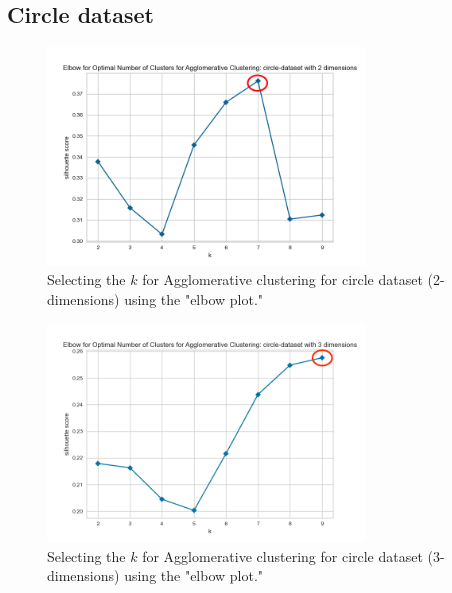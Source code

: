 \subsection{Circle dataset}

\begin{figure}[H]
  \includegraphics[width=0.75\textwidth]{Method/images/k-values/circle-dataset-2-agglomerative.png}
  \caption{Selecting the $k$ for Agglomerative clustering for circle dataset (2-dimensions) using the "elbow plot."}
  \label{hyperparameters:agglomerative-circle-dataset-2d}
\end{figure}
\begin{figure}[H]
  \includegraphics[width=0.75\textwidth]{Method/images/k-values/circle-dataset-3-agglomerative.png}
  \caption{Selecting the $k$ for Agglomerative clustering for circle dataset (3-dimensions) using the "elbow plot."}
  \label{hyperparameters:agglomerative-circle-dataset-3d}
\end{figure}
\newpage

